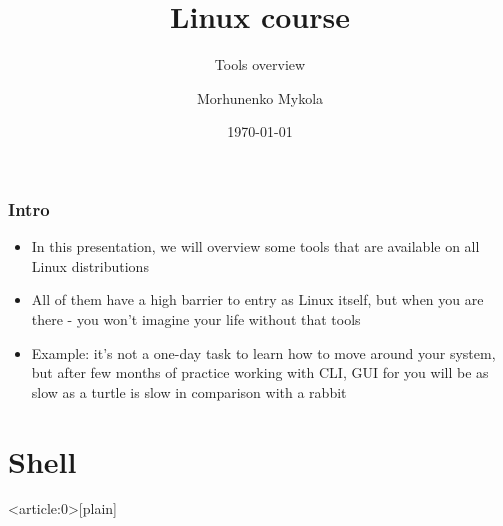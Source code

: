 \documentclass[usenames,dvipsnames,10pt,aspectratio=169]{beamer}
\title{Linux course}
\subtitle{Tools overview}
\date[\today]{\small\today}
\author[Morhunenko Mykola]{Morhunenko Mykola}
\institute{APPS@UCU}
\begin{document}
\begin{frame}
\titlepage
\end{frame}

\begin{frame}{\contentsname}
    \tableofcontents
\end{frame}

\begin{frame}
    \frametitle{Intro}
    \begin{itemize}
        \item In this presentation, we will overview some tools that are available on all Linux distributions
        \item All of them have a high barrier to entry as Linux itself, but when you are there - you won't imagine your life without that tools
        \item Example: it's not a one-day task to learn how to move around your system, but after few months of practice working with CLI, GUI for you will be as slow as a turtle is slow in comparison with a rabbit
    \end{itemize}
\end{frame}

\section{Shell}
{ %
    \begin{frame}<article:0>[plain]
     \end{frame}
}
\end{document}
